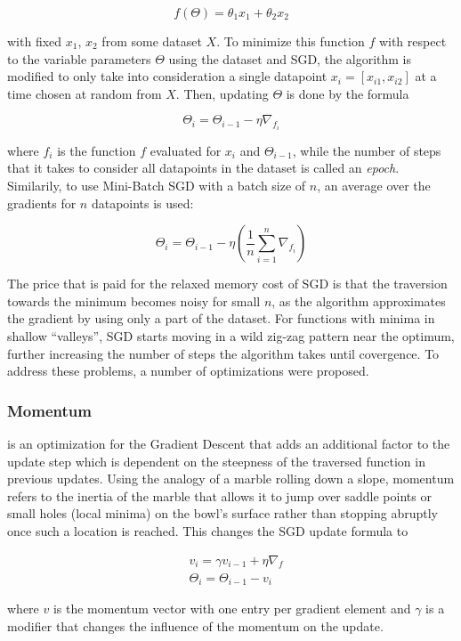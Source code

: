 \[ f(\Theta) =  \theta_1 x_1 + \theta_2 x_2\]

\noindent with fixed $x_1$, $x_2$ from some dataset $X$. To minimize this function $f$ with respect to the variable parameters $\Theta$ using the dataset and SGD, the algorithm is modified to only take into consideration a single datapoint $x_i = [x_{i1}, x_{i2}]$ at a time chosen at random from $X$. Then, updating $\Theta$ is done by the formula

\[ \Theta_i = \Theta_{i-1} - \eta \nabla_{f_i} \]

\noindent where $f_i$ is the function $f$ evaluated for $x_i$ and $\Theta_{i-1}$, while the number of steps that it takes to consider all datapoints in the dataset is called an \textit{epoch}. Similarily, to use Mini-Batch SGD with a batch size of $n$, an average over the gradients for $n$ datapoints is used:

\[ \Theta_i = \Theta_{i-1} - \eta \left ( \frac{1}{n} \sum \limits_{i=1}^{n} \nabla_{f_i} \right ) \]

\noindent The price that is paid for the relaxed memory cost of SGD is that the traversion towards the minimum becomes noisy for small $n$, as the algorithm approximates the gradient by using only a part of the dataset. For functions with minima in shallow ``valleys'', SGD starts moving in a wild zig-zag pattern near the optimum, further increasing the number of steps the algorithm takes until covergence. To address these problems, a number of optimizations were proposed.


	\subsubsection {Momentum}
 is an optimization for the Gradient Descent that adds an additional factor to the update step which is dependent on the steepness of the traversed function in previous updates. Using the analogy of a marble rolling down a slope, momentum refers to the inertia of the marble that allows it to jump over saddle points or small holes (local minima) on the bowl's surface rather than stopping abruptly once such a location is reached. This changes the SGD update formula to

\begin {align}
	& v_i = \gamma v_ {i-1} + \eta \nabla_f\\ 
	& \Theta_i = \Theta_{i-1} - v_i
\end {align}

\noindent where $v$ is the momentum vector with one entry per gradient element and $\gamma$ is a modifier that changes the influence of the momentum on the update.

